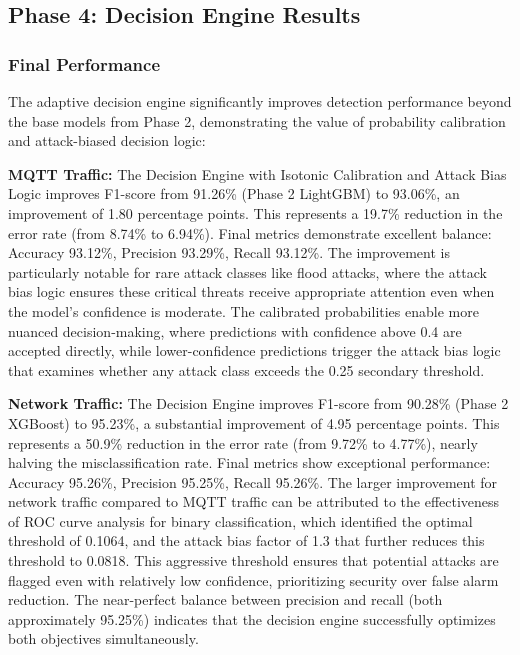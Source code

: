 \documentclass[conference]{IEEEtran}
\begin{document}
\subsection{Phase 4: Decision Engine Results}

\subsubsection{Final Performance}

The adaptive decision engine significantly improves detection performance beyond the base models from Phase 2, demonstrating the value of probability calibration and attack-biased decision logic:

\textbf{MQTT Traffic:} The Decision Engine with Isotonic Calibration and Attack Bias Logic improves F1-score from 91.26\% (Phase 2 LightGBM) to 93.06\%, an improvement of 1.80 percentage points. This represents a 19.7\% reduction in the error rate (from 8.74\% to 6.94\%). Final metrics demonstrate excellent balance: Accuracy 93.12\%, Precision 93.29\%, Recall 93.12\%. The improvement is particularly notable for rare attack classes like flood attacks, where the attack bias logic ensures these critical threats receive appropriate attention even when the model's confidence is moderate. The calibrated probabilities enable more nuanced decision-making, where predictions with confidence above 0.4 are accepted directly, while lower-confidence predictions trigger the attack bias logic that examines whether any attack class exceeds the 0.25 secondary threshold.

\textbf{Network Traffic:} The Decision Engine improves F1-score from 90.28\% (Phase 2 XGBoost) to 95.23\%, a substantial improvement of 4.95 percentage points. This represents a 50.9\% reduction in the error rate (from 9.72\% to 4.77\%), nearly halving the misclassification rate. Final metrics show exceptional performance: Accuracy 95.26\%, Precision 95.25\%, Recall 95.26\%. The larger improvement for network traffic compared to MQTT traffic can be attributed to the effectiveness of ROC curve analysis for binary classification, which identified the optimal threshold of 0.1064, and the attack bias factor of 1.3 that further reduces this threshold to 0.0818. This aggressive threshold ensures that potential attacks are flagged even with relatively low confidence, prioritizing security over false alarm reduction. The near-perfect balance between precision and recall (both approximately 95.25\%) indicates that the decision engine successfully optimizes both objectives simultaneously.
\end{document}
